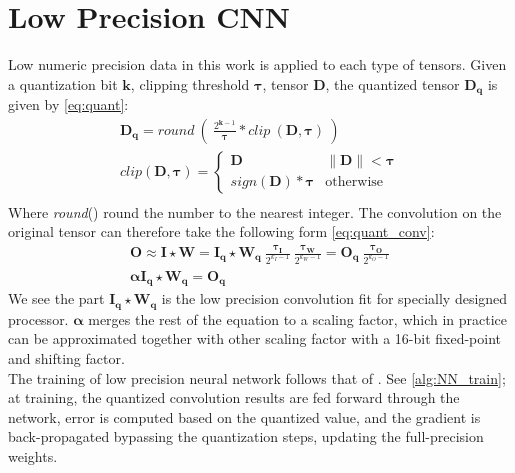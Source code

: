  
\section{Low Precision CNN}
Low numeric precision data in this work is applied to each type of tensors. Given a quantization bit $\boldsymbol{k}$, clipping threshold $\boldsymbol{\tau}$, tensor $\boldsymbol{D}$, the quantized tensor $\boldsymbol{D_q}$ is given by \autoref{eq:quant}:
\begin{equation}
    \begin{aligned}\label{eq:quant}
        \boldsymbol{D_q}=
        \textit{round}\ (\ \frac{2^{\boldsymbol{k}-1}}{\boldsymbol{\tau}}*\textit{clip}\ (\boldsymbol{D},\boldsymbol{\tau})
        \ ) \\
        \textit{clip}(\boldsymbol{D},\boldsymbol{\tau})=\begin{cases}
            \boldsymbol{D} &\|\boldsymbol{D}\|<\boldsymbol{\tau} \\
            \textit{sign}(\boldsymbol{D})*\boldsymbol{\tau} &\text{otherwise}
        \end{cases} \\
    \end{aligned}
\end{equation}
Where \textit{round}() round the number to the nearest integer. The convolution on the original tensor can therefore take the following form \autoref{eq:quant_conv}:
\begin{equation}
    \begin{aligned}\label{eq:quant_conv}
        \boldsymbol{O}\approx\boldsymbol{I}\star\boldsymbol{W}= \boldsymbol{I_q}\star\boldsymbol{W_q}
        \ \frac{\boldsymbol{\tau_I}}{2^{k_I-1}}
        \ \frac{\boldsymbol{\tau_W}}{2^{k_W-1}}
        =\boldsymbol{O_q}\  \frac{\boldsymbol{\tau_O}}{2^{k_O-1}} \\
        \boldsymbol{\alpha}\boldsymbol{I_q}\star\boldsymbol{W_q}=\boldsymbol{O_q}
    \end{aligned}
\end{equation}
We see the part $\boldsymbol{I_q}\star\boldsymbol{W_q}$ is the low precision convolution fit for specially designed processor. $\boldsymbol{\alpha}$ merges the rest of the equation to a scaling factor, which in practice can be approximated together with other scaling factor with a 16-bit fixed-point and shifting factor. \\
The training of low precision neural network follows that of \cite{XnorNet}. See \autoref{alg:NN_train}; at training, the quantized convolution results are fed forward through the network, error is computed based on the quantized value, and the gradient is back-propagated bypassing the quantization steps, updating the full-precision weights.
